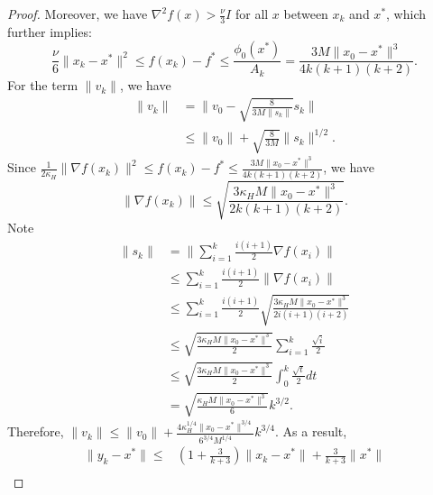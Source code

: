 \documentclass{mcom-l}
\numberwithin{equation}{section}
\begin{document}
\begin{proof}
    Moreover, we have $\nabla^2 f(x) >\frac{\nu}{3}I$ for all $x$ between $x_k$ and $x^*$, which further implies:
    \begin{equation*}
        \frac{\nu}{6}\|x_k-x^*\|^2 \leq f(x_k)-f^* \leq \frac{\phi_0(x^*)}{A_k}=\frac{3M\|x_0-x^*\|^3}{4 k(k+1)(k+2)}.
    \end{equation*}
    For the term $\|v_k\|$, we have
    \begin{equation*}
        \begin{aligned}
            \|v_k\| & =\|v_0-\sqrt{\frac{8}{3M\|s_{k}\|}}s_k\|       \\
                    & \leq \|v_0\|+\sqrt{\frac{8}{3M}}\|s_k\|^{1/2}.
        \end{aligned}
    \end{equation*}
    Since $\frac{1}{2\kappa_H}\|\nabla f(x_k)\|^2 \leq f(x_k)-f^* \leq \frac{3M\|x_0-x^*\|^3}{4 k(k+1)(k+2)}$, we have
    \begin{equation*}
        \|\nabla f(x_k)\|\leq \sqrt{\frac{3\kappa_H M\|x_0-x^*\|^3}{2 k(k+1)(k+2)}}.
    \end{equation*}
    Note
    \begin{equation*}
        \begin{aligned}
            \|s_k\| & =\|\sum_{i=1}^k\frac{i(i+1)}{2}\nabla f(x_i)\|                                         \\
                    & \leq \sum_{i=1}^k \frac{i(i+1)}{2}\|\nabla f(x_i)\|                                    \\
                    & \leq \sum_{i=1}^k\frac{i(i+1)}{2}\sqrt{\frac{3\kappa_H M\|x_0-x^*\|^3}{2 i(i+1)(i+2)}} \\
                    & \leq \sqrt{\frac{3\kappa_H M\|x_0-x^*\|^3}{2}}\sum_{i=1}^k\frac{\sqrt{i}}{2}           \\
                    & \leq \sqrt{\frac{3\kappa_H M\|x_0-x^*\|^3}{2}}\int_0^k \frac{\sqrt{t}}{2}dt            \\
                    & =\sqrt{\frac{\kappa_H M\|x_0-x^*\|^3}{6}}k^{3/2}.
        \end{aligned}
    \end{equation*}
    Therefore, $\|v_k\|\leq \|v_0\|+\frac{4\kappa_H^{1/4}\|x_0-x^*\|^{3/4}}{6^{3/4}M^{1/4}}k^{3/4}$. As a result,
    \begin{equation}
        \label{eq.bound yk}
        \begin{aligned}
            \|y_k-x^*\|\leq & (1+\frac{3}{k+3})\|x_k-x^*\|+\frac{3}{k+3}\|x^*\|                                      \\

\end{aligned}
\end{equation}
\end{proof}
\end{document}
